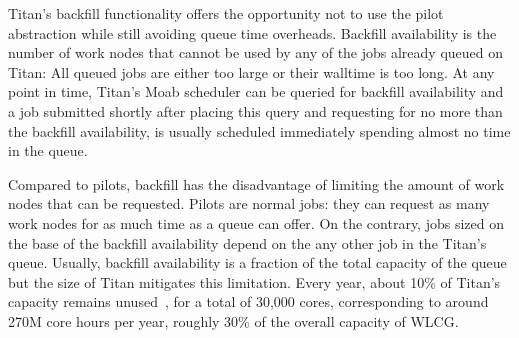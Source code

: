 Titan's backfill functionality offers the opportunity not to use the pilot
abstraction while still avoiding queue time overheads. Backfill availability is
the number of work nodes that cannot be used by any of the jobs already queued
on Titan: All queued jobs are either too large or their walltime is too long. At
any point in time, Titan's Moab scheduler can be queried for backfill
availability and a job submitted shortly after placing this query and requesting
for no more than the backfill availability, is usually scheduled immediately
spending almost no time in the queue.

Compared to pilots, backfill has the disadvantage of limiting the amount of work
nodes that can be requested. Pilots are normal jobs: they can request as many
work nodes for as much time as a queue can offer. On the contrary, jobs sized on
the base of the backfill availability depend on the
any other job in the Titan's queue. Usually, backfill availability is a fraction of
the total capacity of the queue but the size of Titan mitigates this limitation.
Every year, about 10\% of Titan's capacity remains
unused~\cite{titan_utilization}, for a total of 30,000 cores, corresponding to
around 270M core hours per year, roughly 30\% of the overall capacity of WLCG.


 

